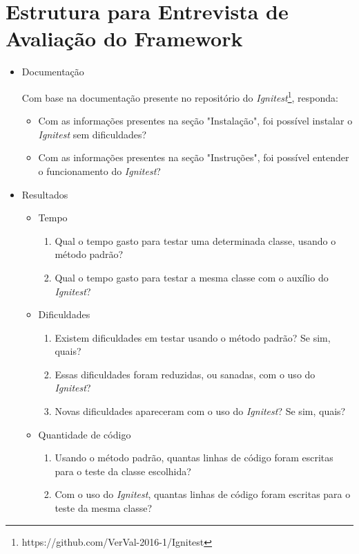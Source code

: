 \chapter{Estrutura para Entrevista de Avaliação do Framework}
\label{questionario}

  
    \begin{itemize}
        \item Documentação
        
            Com base na documentação presente no repositório do \textit{Ignitest}\footnote{https://github.com/VerVal-2016-1/Ignitest}, responda:
            \begin{itemize}
                \item Com as informações presentes na seção "Instalação", foi possível instalar o \textit{Ignitest} sem dificuldades?
                \item Com as informações presentes na seção "Instruções", foi possível entender o funcionamento do \textit{Ignitest}?
            \end{itemize}
            
        \item Resultados
            \begin{itemize}
                \item Tempo
                    \begin{enumerate}
                        \item Qual o tempo gasto para testar uma determinada classe, usando o método padrão?
                        \item Qual o tempo gasto para testar a mesma classe com o auxílio do \textit{Ignitest}?
                    \end{enumerate}
                \item Dificuldades
                    \begin{enumerate}
                        \item Existem dificuldades em testar usando o método padrão? Se sim, quais?
                        \item Essas dificuldades foram reduzidas, ou sanadas, com o uso do \textit{Ignitest}?
                        \item Novas dificuldades apareceram com o uso do \textit{Ignitest}? Se sim, quais?
                    \end{enumerate}
                \item Quantidade de código
                    \begin{enumerate}
                        \item Usando o método padrão, quantas linhas de código foram escritas para o teste da classe escolhida?
                        \item Com o uso do \textit{Ignitest}, quantas linhas de código foram escritas para o teste da mesma classe?
                    \end{enumerate}


\end{itemize}
\end{itemize}
